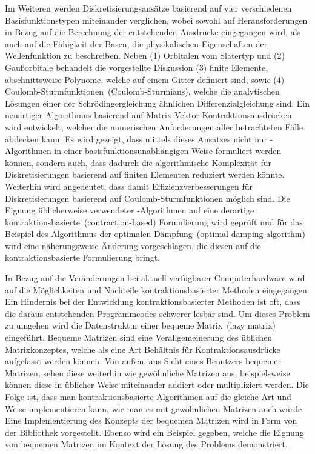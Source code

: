 Im Weiteren werden Diskretisierungsansätze basierend auf vier verschiedenen
Basisfunktionstypen miteinander verglichen,
wobei sowohl auf Herausforderungen in Bezug auf die Berechnung
der entstehenden Ausdrücke
eingegangen wird,
als auch auf die Fähigkeit der Basen,
die physikalischen Eigenschaften der Wellenfunktion zu beschreiben.
Neben (1) Orbitalen vom Slatertyp und (2) Gaußorbitale
behandelt die vorgestellte Diskussion
(3) finite Elemente,
abschnittsweise Polynome, welche auf einem Gitter definiert sind,
sowie (4) Coulomb-Sturmfunktionen~(Coulomb-Sturmians),
welche die analytischen Lösungen einer der Schrödingergleichung
ähnlichen Differenzialgleichung sind.
Ein neuartiger Algorithmus basierend auf Matrix-Vektor-Kontraktionsausdrücken
wird entwickelt,
welcher die numerischen Anforderungen aller betrachteten Fälle abdecken kann.
Es wird gezeigt, dass mittels dieses Ansatzes
nicht nur \SCF-Algorithmen in einer basisfunktionsunabhängigen Weise
formuliert werden können,
sondern auch,
dass dadurch die algorithmische Komplexität
für Diskretisierungen basierend auf finiten Elementen
reduziert werden könnte.
Weiterhin wird angedeutet,
dass damit Effizienzverbesserungen
für Diskretisierungen basierend auf Coulomb-Sturmfunktionen
möglich sind.
Die Eignung üblicherweise verwendeter \SCF-Algorithmen
auf eine derartige kontraktionsbasierte~(contraction-based)
Formulierung wird geprüft
und für das Beispiel des Algorithmus der optimalen Dämpfung~(optimal damping algorithm)
wird eine näherungsweise Änderung vorgeschlagen,
die diesen auf die kontraktionsbasierte Formulierung bringt.

In Bezug auf die Veränderungen bei aktuell verfügbarer Computerhardware
wird auf die Möglichkeiten und Nachteile
kontraktionsbasierter Methoden eingegangen.
Ein Hindernis bei der Entwicklung kontraktionsbasierter Methoden
ist oft, dass die daraus entstehenden Programmcodes
schwerer lesbar sind.
Um dieses Problem zu umgehen wird die Datenstruktur
einer bequeme Matrix~(lazy matrix) eingeführt.
Bequeme Matrizen sind eine Verallgemeinerung des üblichen Matrixkonzeptes,
welche als eine Art Behältnis für Kontraktionsausdrücke aufgefasst
werden können.
Von außen, aus Sicht eines Benutzers bequemer Matrizen,
sehen diese weiterhin wie gewöhnliche Matrizen aus,
beispielsweise können diese in üblicher Weise
miteinander addiert oder multipliziert werden.
Die Folge ist,
dass man kontraktionsbasierte Algorithmen auf die gleiche Art und Weise
implementieren kann,
wie man es mit gewöhnlichen Matrizen auch würde.
Eine Implementierung des Konzepts der bequemen Matrizen
wird in Form von der Bibliothek \lazyten vorgestellt.
Ebenso wird ein Beispiel gegeben,
welche die Eignung von bequemen Matrizen im Kontext der
Lösung des \HF Problems demonstriert.

